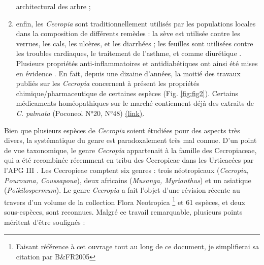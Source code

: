 \documentclass[a4paper]{article}
\let\rmarkdownfootnote\footnote%
\def\footnote{\protect\rmarkdownfootnote}
\theoremstyle{definition}
\theoremstyle{definition}
\theoremstyle{definition}
\theoremstyle{remark}
\begin{document}
\begin{enumerate}
  architectural des arbre \citep{Letort2012};
\item
  enfin, les \emph{Cecropia} sont traditionnellement utilisés par les
  populations locales dans la composition de différents remèdes : la
  sève est utilisée contre les verrues, les cals, les ulcères, et les
  diarrhées ; les feuilles sont utilisées contre les troubles
  cardiaques, le traitement de l'asthme, et comme diurétique
  \citep{Berg2005}. Plusieurs propriétés anti-inflammatoires et
  antidiabétiques ont ainsi été mises en évidence \citep{Costa2011}. En
  fait, depuis une dizaine d'années, la moitié des travaux publiés sur
  les \emph{Cecropia} concernent à présent les propriétés
  chimique/pharmaceutique de certaines espèces (Fig. \ref{fig:fig2}).
  Certains médicaments homéopathiques sur le marché contiennent déjà des
  extraits de \emph{C. palmata} (Poconeol N°20, N°48)
  \href{http://www.vidal.fr/Substance/cecropia_palmata-843.htm}{(link)}.
\end{enumerate}

Bien que plusieurs espèces de \emph{Cecropia} soient étudiées pour des
aspects très divers, la systématique du genre est paradoxalement très
mal connue. D'un point de vue taxonomique, le genre \emph{Cecropia}
appartenait à la famille des Cecropiaceae, qui a été recombinée
récemment en tribu des Cecropieae dans les Urticacées par l'APG III
\citep{apg3}. Les Cecropieae comptent six genres : trois néotropicaux
(\emph{Cecropia, Pourouma, Coussapoua}), deux africains (\emph{Musanga,
Myrianthus}) et un asiatique (\emph{Poikilospermum}). Le genre
\emph{Cecropia} a fait l'objet d'une révision récente au travers d'un
volume de la collection Flora Neotropica \citep{Berg2005}\footnote{Faisant
  référence à cet ouvrage tout au long de ce document, je simplifierai
  sa citation par B\&FR2005} et 61 espèces, et deux sous-espèces, sont
reconnues. Malgré ce travail remarquable, plusieurs points méritent
d'être soulignés :
\end{document}
